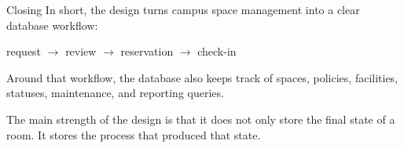 \documentclass[aspectratio=169]{beamer}
\begin{document}
\begin{frame}{Closing}
    In short, the design turns campus space management into a clear database workflow:

    \vspace{0.4cm}
    \begin{center}
        request \(\rightarrow\) review \(\rightarrow\) reservation \(\rightarrow\) check-in
    \end{center}

    \vspace{0.4cm}
    Around that workflow, the database also keeps track of spaces, policies,
    facilities, statuses, maintenance, and reporting queries.

    \vspace{0.4cm}
    The main strength of the design is that it does not only store the final state
    of a room. It stores the process that produced that state.
\end{frame}
\end{document}
